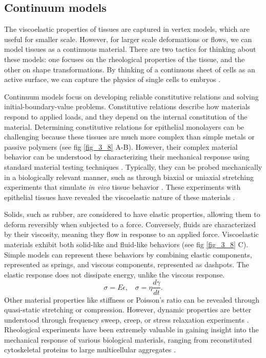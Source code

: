 \hypertarget{continuum-models}{%
	\subsection{Continuum models}\label{continuum-models}}

The viscoelastic properties of tissues are captured in vertex models, which are useful for smaller scale. However, for larger scale deformations or flows, we can model tissues as a continuous material. There are two tactics for thinking about these models: one focuses on the rheological properties of the tissue, and the other on shape transformations. By thinking of a continuous sheet of cells as an active surface, we can capture the physics of single cells to embryos \cite{salbreux2017, khoromskaia2023}.

Continuum models focus on developing reliable constitutive relations and solving initial-boundary-value problems. Constitutive relations describe how materials respond to applied loads, and they depend on the internal constitution of the material. Determining constitutive relations for epithelial monolayers can be challenging because these tissues are much more complex than simple metals or passive polymers (see fig \ref{fig_3_8} A-B). However, their complex material behavior can be understood by characterizing their mechanical response using standard material testing techniques \cite{humphrey2002}. Typically, they can be probed mechanically in a biologically relevant manner, such as through biaxial or uniaxial stretching experiments that simulate \textit{in vivo} tissue behavior \cite{humphrey2014}. These experiments with epithelial tissues have revealed the viscoelastic nature of these materials \cite{harris2012, khalilgharibi2019}.

Solids, such as rubber, are considered to have elastic properties, allowing them to deform reversibly when subjected to a force. Conversely, fluids are characterized by their viscosity, meaning they flow in response to an applied force. Viscoelastic materials exhibit both solid-like and fluid-like behaviors (see fig \ref{fig_3_8} C). Simple models can represent these behaviors by combining elastic components, represented as springs, and viscous components, represented as dashpots. The elastic response does not dissipate energy, unlike the viscous response. $$ \sigma = E\epsilon ,\ \ \ \ \sigma = \eta \frac{d\gamma}{dt}. $$ Other material properties like stiffness or Poisson's ratio can be revealed through quasi-static stretching or compression. However, dynamic properties are better understood through frequency sweep, creep, or stress relaxation experiments \cite{guimaraes2020}. Rheological experiments have been extremely valuable in gaining insight into the mechanical response of various biological materials, ranging from reconstituted cytoskeletal proteins to large multicellular aggregates \cite{mofrad2009, cavanaugh2020, xi2018}.

